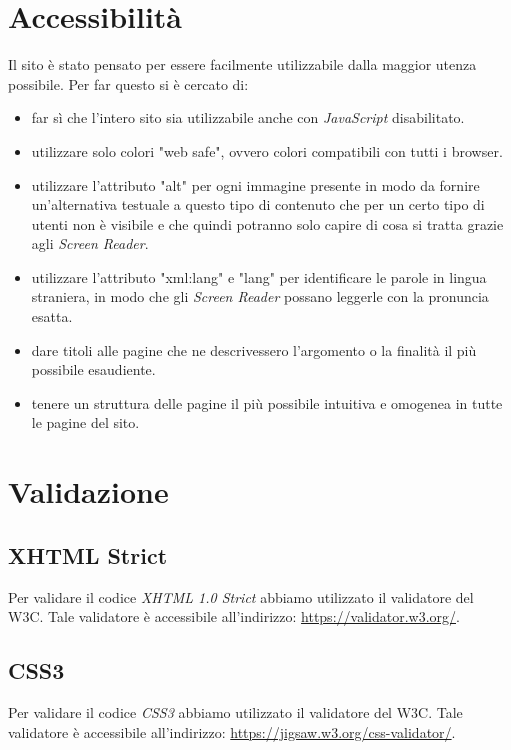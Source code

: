 \documentclass[12pt]{article}
\begin{document}
\section{Accessibilità}
Il sito è stato pensato per essere facilmente utilizzabile dalla maggior utenza possibile. Per far questo si è cercato di:
\begin{itemize}
\item far sì che l'intero sito sia utilizzabile anche con \textit{JavaScript} disabilitato.
\item utilizzare solo colori "web safe", ovvero colori compatibili con tutti i browser.
\item utilizzare l'attributo "alt" per ogni immagine presente in modo da fornire un'alternativa testuale a questo tipo di contenuto che per un certo tipo di utenti non è visibile e che quindi potranno solo capire di cosa si tratta grazie agli \textit{Screen Reader}.
\item utilizzare l'attributo "xml:lang" e "lang" per identificare le parole in lingua straniera, in modo che gli \textit{Screen Reader} possano leggerle con la pronuncia esatta.
\item dare titoli alle pagine che ne descrivessero l'argomento o la finalità il più possibile esaudiente.
\item tenere un struttura delle pagine il più possibile intuitiva e omogenea in tutte le pagine del sito.
\end{itemize}

\section{Validazione}
\subsection{XHTML Strict}
Per validare il codice \textit{XHTML 1.0 Strict} abbiamo utilizzato il validatore del W3C. Tale validatore è accessibile all'indirizzo:  \url{https://validator.w3.org/}.
\subsection{CSS3}
Per validare il codice \textit{CSS3} abbiamo utilizzato il validatore del W3C. Tale validatore è accessibile all'indirizzo:  \url{https://jigsaw.w3.org/css-validator/}.
\end{document}
